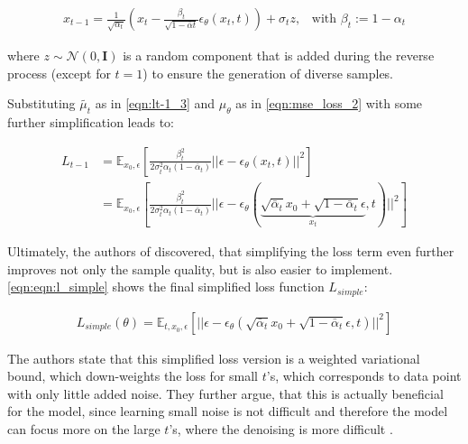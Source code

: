 \begin{equation}
  \begin{align*}
    \label{eqn:xt-1}
    x_{t-1} = \frac{1}{\sqrt{\alpha_t}}\left(x_t - \frac{\beta_t}{\sqrt{1-\bar{\alpha}t}}\epsilon_{\theta}(x_t,t)\right) + \sigma_t z \textrm{,}\quad
    \textrm{with } \beta_t := 1-\alpha_t
  \end{align*}
\end{equation}

where $z\sim\mathcal{N}(0,\textbf{I})$ is a random component that is added during the reverse process (except for $t=1$) to ensure the generation of diverse samples.

Substituting $\tilde{\mu_t}$ as in \autoref{eqn:lt-1_3} and $\mu_\theta$ as in \autoref{eqn:mse_loss_2} with some further simplification leads to:

\begin{equation}
  \begin{align*}
    \label{eqn:eqn:lt-1_4}
    L_{t-1} &= \mathbb{E}_{x_0,\epsilon} \left[  \frac{\beta^2_t}{2\sigma_t^2 \alpha_t (1-\bar{\alpha}_t)} ||\epsilon - \epsilon_\theta(x_t,t)||^2 \right] \\
    &= \mathbb{E}_{x_0,\epsilon} \left[  \frac{\beta^2_t}{2\sigma_t^2 \alpha_t (1-\bar{\alpha}_t)} ||\epsilon - \epsilon_\theta( \underbrace{\sqrt{\bar{\alpha}_t} x_0 + \sqrt{1-\bar{\alpha}_t}\epsilon}_{x_t}, t)||^2 \right]
  \end{align*}
\end{equation}


Ultimately, the authors of \cite[p. 5]{ho2020DenoisingDiffusionProbabilistic} discovered, that simplifying the loss term even further improves not only the sample quality,
but is also easier to implement.
\autoref{eqn:eqn:l_simple} shows the final simplified loss function $L_{simple}$:


\begin{equation}
  \begin{align*}
    \label{eqn:eqn:l_simple}
    L_{simple}(\theta) = \mathbb{E}_{t, x_0,\epsilon} \left[ ||\epsilon - \epsilon_\theta( \sqrt{\bar{\alpha}_t} x_0 + \sqrt{1-\bar{\alpha}_t}\epsilon, t)||^2 \right]
  \end{align*}
\end{equation}

The authors \cite{ho2020DenoisingDiffusionProbabilistic} state that this simplified loss version is a weighted variational bound, which down-weights the loss for small $t$'s, which corresponds to data point with only little added noise.
They further argue, that this is actually beneficial for the model, since learning small noise is not difficult and therefore the model can focus more on the large $t$'s, where the denoising is more difficult \cite{ho2020DenoisingDiffusionProbabilistic}.

